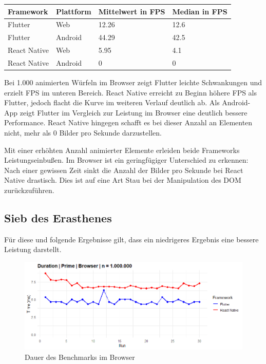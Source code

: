 \begin{table}[h!]
    \centering
    \begin{tabular}{llll}
    \toprule
    \textbf{Framework} & \textbf{Plattform} & \textbf{Mittelwert in FPS} & \textbf{Median in FPS} \\
    \midrule
        Flutter & Web & 12.26 & 12.6 \\
        Flutter & Android & 44.29 & 42.5 \\
        React Native & Web & 5.95 & 4.1 \\
        React Native & Android & 0 & 0 \\
    \bottomrule
    \end{tabular}
\end{table}

Bei 1.000 animierten Würfeln im Browser zeigt Flutter leichte Schwankungen und erzielt FPS im unteren Bereich. React Native erreicht zu Beginn höhere FPS als Flutter, jedoch flacht die Kurve im weiteren Verlauf deutlich ab. Als Android-App zeigt Flutter im Vergleich zur Leistung im Browser eine deutlich bessere Performance. React Native hingegen schafft es bei dieser Anzahl an Elementen nicht, mehr als 0 Bilder pro Sekunde darzustellen.

Mit einer erhöhten Anzahl animierter Elemente erleiden beide Frameworks Leistungseinbußen. Im Browser ist ein geringfügiger Unterschied zu erkennen: Nach einer gewissen Zeit sinkt die Anzahl der Bilder pro Sekunde bei React Native drastisch. Dies ist auf eine Art Stau bei der Manipulation des DOM zurückzuführen.

\newpage
\subsection{Sieb des Erasthenes}
Für diese und folgende Ergebnisse gilt, dass ein niedrigeres Ergebnis eine bessere Leistung darstellt.
\begin{figure}[H]
    \centering
    \includegraphics[width=1\linewidth]{images/web/prime.png}
    \caption{Dauer des Benchmarks im Browser}
\end{figure}

